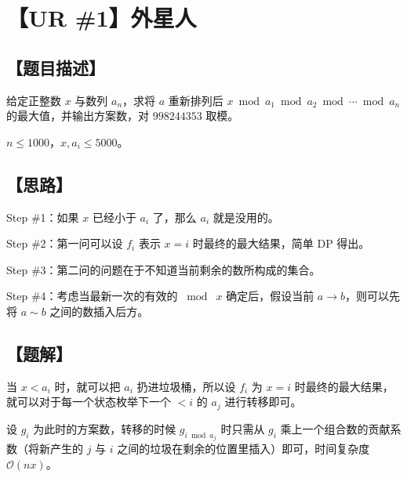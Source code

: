 \documentclass[UTF8,12pt,a4paper]{ctexart} %
\begin{document}
	\fontsize{12pt}{12pt}\selectfont
	
	\newpage
	\pagestyle{fancy}
	
	\section*{【UR \#1】外星人}
	
	\subsection*{【题目描述】}
	
	给定正整数 $x$ 与数列 $a_n$，求将 $a$ 重新排列后 $x\bmod a_1\bmod a_2\bmod\cdots\bmod a_n$ 的最大值，并输出方案数，对 $998244353$ 取模。
	
	$n\le1000$，$x,a_i\le5000$。
	
	\subsection*{【思路】}
	
	Step \#1：如果 $x$ 已经小于 $a_i$ 了，那么 $a_i$ 就是没用的。
	
	Step \#2：第一问可以设 $f_i$ 表示 $x=i$ 时最终的最大结果，简单 $\text{DP}$ 得出。
	
	Step \#3：第二问的问题在于不知道当前剩余的数所构成的集合。
	
	Step \#4：考虑当最新一次的有效的 $\bmod\;x$ 确定后，假设当前 $a\rightarrow b$，则可以先将 $a\sim b$ 之间的数插入后方。
	
	\subsection*{【题解】}
	
	当 $x<a_i$ 时，就可以把 $a_i$ 扔进垃圾桶，所以设 $f_i$ 为 $x=i$ 时最终的最大结果，就可以对于每一个状态枚举下一个 $<i$ 的 $a_j$ 进行转移即可。
	
	设 $g_i$ 为此时的方案数，转移的时候 $g_{i\bmod a_j}$ 时只需从 $g_i$ 乘上一个组合数的贡献系数（将新产生的 $j$ 与 $i$ 之间的垃圾在剩余的位置里插入）即可，时间复杂度 $\mathcal{O}(nx)$。
	
	
\end{document}
